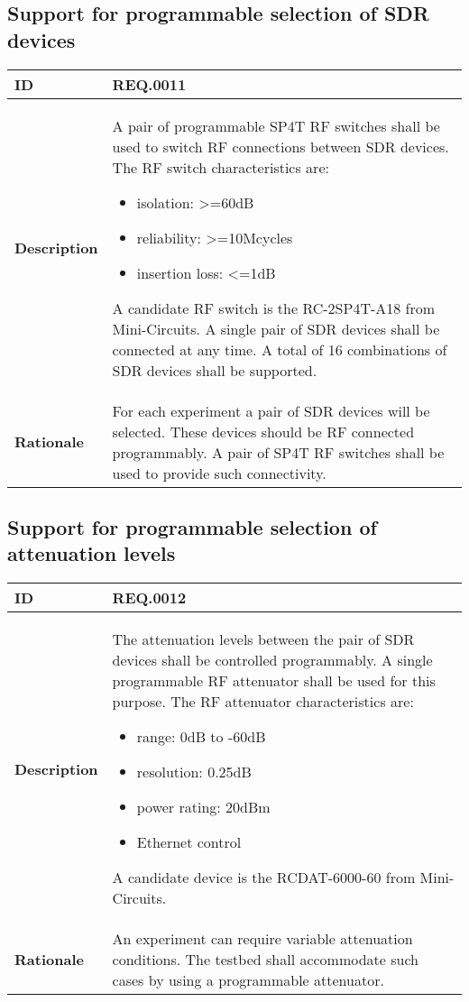 \documentclass[english,titlepage,a4paper]{report}
\begin{document}
\subsection{Support for programmable selection of SDR devices}
\begin{tabular}{|l|p{9cm}|}
  \hline
  \textbf{ID} & REQ.0011 \\
  \hline
  \textbf{Description} &
  A pair of programmable SP4T RF switches shall be used to switch RF connections between SDR devices.
  The RF switch characteristics are:
  \begin{itemize}
  \item isolation: >=60dB
  \item reliability: >=10Mcycles
  \item insertion loss: <=1dB
  \end{itemize}
  A candidate RF switch is the RC-2SP4T-A18 from Mini-Circuits.
  A single pair of SDR devices shall be connected at any time.
  A total of 16 combinations of SDR devices shall be supported.
  \\
  \hline
  \textbf{Rationale} &
  For each experiment a pair of SDR devices will be selected.
  These devices should be RF connected programmably.
  A pair of SP4T RF switches shall be used to provide such connectivity.
  \\
  \hline
\end{tabular}

\subsection{Support for programmable selection of attenuation levels}
\begin{tabular}{|l|p{9cm}|}
  \hline
  \textbf{ID} & REQ.0012 \\
  \hline
  \textbf{Description} &
  The attenuation levels between the pair of SDR devices shall be controlled programmably.
  A single programmable RF attenuator shall be used for this purpose.
  The RF attenuator characteristics are:
  \begin{itemize}
  \item range: 0dB to -60dB
  \item resolution: 0.25dB
  \item power rating: 20dBm
  \item Ethernet control
  \end{itemize}
  A candidate device is the RCDAT-6000-60 from Mini-Circuits.
  \\
  \hline
  \textbf{Rationale} &
  An experiment can require variable attenuation conditions.
  The testbed shall accommodate such cases by using a programmable attenuator.
  \\
  \hline
\end{tabular}
\end{document}

